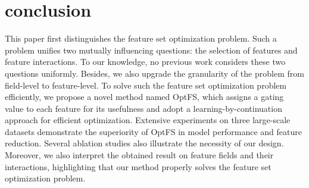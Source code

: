 \documentclass[sigconf]{acmart}
\begin{document}
\vspace{-5pt}
 \section{conclusion}
\label{sec:conclusion}
This paper first distinguishes the feature set optimization problem. Such a problem unifies two mutually influencing questions: the selection of features and feature interactions. To our knowledge, no previous work considers these two questions uniformly. Besides, we also upgrade the granularity of the problem from field-level to feature-level. To solve such the feature set optimization problem efficiently, we propose a novel method named OptFS, which assigns a gating value to each feature for its usefulness and adopt a learning-by-continuation approach for efficient optimization. Extensive experiments on three large-scale datasets demonstrate the superiority of OptFS in model performance and feature reduction. Several ablation studies also illustrate the necessity of our design. Moreover, we also interpret the obtained result on feature fields and their interactions, highlighting that our method properly solves the feature set optimization problem. 
 
\normalem


\end{document}
